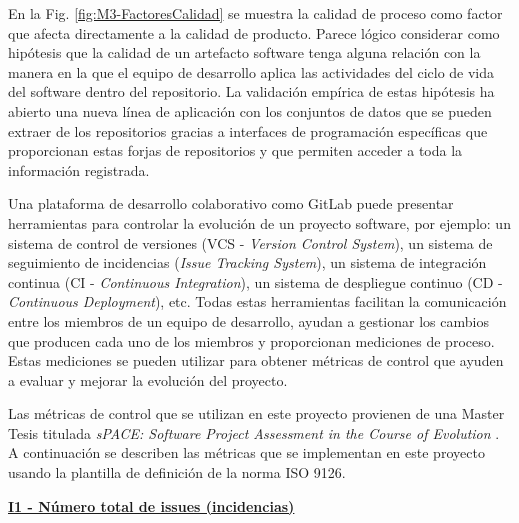 En la Fig. \ref{fig:M3-FactoresCalidad} se muestra la calidad de proceso como factor que afecta directamente a la calidad de producto. Parece lógico considerar como hipótesis que la calidad de un artefacto software tenga alguna relación con la manera en la que el equipo de desarrollo aplica las actividades del ciclo de vida del software dentro del repositorio. La validación empírica de estas  hipótesis ha abierto una nueva línea de aplicación con los conjuntos de datos que se pueden extraer de los repositorios gracias a interfaces de programación específicas que proporcionan estas forjas de repositorios y que permiten acceder a toda la información registrada.

Una plataforma de desarrollo colaborativo como GitLab puede presentar herramientas para controlar la evolución de un proyecto software, por ejemplo: un sistema de control de versiones (VCS - \textit{Version Control System}), un sistema de seguimiento de incidencias (\textit{Issue Tracking System}), un sistema de integración continua (CI - \textit{Continuous Integration}), un sistema de despliegue continuo (CD - \textit{Continuous Deployment}), etc.
Todas estas herramientas facilitan la comunicación entre los miembros de un equipo de desarrollo, ayudan a gestionar los cambios que producen cada uno de los miembros y proporcionan mediciones de proceso. Estas mediciones se pueden utilizar para obtener métricas de control que ayuden a evaluar y mejorar la evolución del proyecto.

Las métricas de control que se utilizan en este proyecto provienen de una Master Tesis titulada \textit{sPACE: Software Project Assessment in the Course of Evolution} \citep{ratzinger_space:_2007}. 
A continuación se describen las métricas que se implementan en este proyecto usando la plantilla de definición de la norma ISO 9126.

 
\textbf{\underline{I1 - Número total de issues (incidencias)}}


